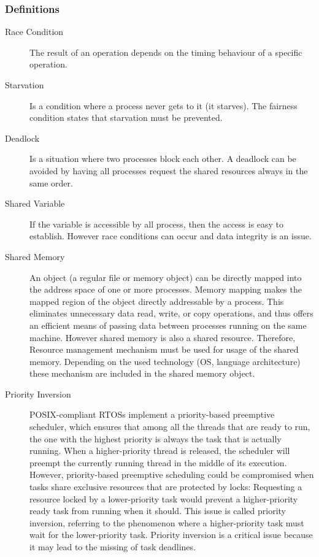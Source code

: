 \subsubsection{Definitions}
\begin{description}
  \item[Race Condition]  The result of an operation depends on the timing behaviour of a specific operation.
  \item[Starvation]      Is a condition where a process never gets to it (it starves).
        The fairness condition states that starvation must be prevented.
  \item[Deadlock]        Is a situation where two processes block each other.
        A deadlock can be avoided by having all processes request the shared resources always in the same order.
  \item[Shared Variable] If the variable is accessible by all process, then the access is easy to establish.
        However race conditions can occur and data integrity is an issue.
  \item[Shared Memory] An object (a regular file or memory object) can be directly mapped into the address space of one or more processes.
        Memory mapping makes the mapped region of the object directly addressable by a process.
        This eliminates unnecessary data read, write, or copy operations, and thus offers an efficient means of passing data between processes running on the same machine.
        However shared memory is also a shared resource.
        Therefore, Resource management mechanism must be used for usage of the shared memory.
        Depending on the used technology (OS, language architecture) these mechanism are included in the shared memory object.
  \item[Priority Inversion] POSIX-compliant RTOSs implement a priority-based preemptive scheduler, which ensures that among all the threads that are ready to run, the one with the highest priority is always the task that is actually running.
        When a higher-priority thread is released, the scheduler will preempt the currently running thread in the middle of its execution.
        However, priority-based preemptive scheduling could be compromised when tasks share exclusive resources that are protected by locks:
        Requesting a resource locked by a lower-priority task would prevent a higher-priority ready task from running when it should.
        This issue is called priority inversion, referring to the phenomenon where a higher-priority task must wait for the lower-priority task.
        Priority inversion is a critical issue because it may lead to the missing of task deadlines.
\end{description}

